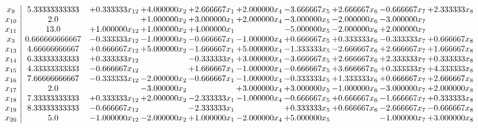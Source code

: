 \documentclass[10pt]{article}
\begin{document}
 \[\begin{array}{c| c c@{\hskip 2pt} c@{\hskip 2pt} c@{\hskip 2pt} c@{\hskip 2pt} c@{\hskip 2pt} c@{\hskip 2pt} c@{\hskip 2pt} c@{\hskip 2pt} }
 x_{9}   &  5.33333333333 & + 0.333333 x_{12} & + 4.000000 x_{2} & + 2.666667 x_{1} & + 2.000000 x_{4} & -3.666667 x_{5} & + 2.666667 x_{6} & -0.666667 x_{7} & + 2.333333 x_{8}\\
 x_{10}   &  2.0  &   & + 1.000000 x_{2} & + 3.000000 x_{1} & + 2.000000 x_{4} & -3.000000 x_{5} & -2.000000 x_{6} & -3.000000 x_{7} &   \\
 x_{11}   &  13.0 & + 1.000000 x_{12} & + 1.000000 x_{2} & + 4.000000 x_{1} &   & -5.000000 x_{5} & -2.000000 x_{6} & + 2.000000 x_{7} &   \\
 x_{3}   &  0.666666666667 & -0.333333 x_{12} & -1.000000 x_{2} & -0.666667 x_{1} & -1.000000 x_{4} & + 0.666667 x_{5} & + 0.333333 x_{6} & -0.333333 x_{7} & + 0.666667 x_{8}\\
 x_{13}   &  4.66666666667 & + 0.666667 x_{12} & + 5.000000 x_{2} & -1.666667 x_{1} & + 5.000000 x_{4} & -1.333333 x_{5} & -2.666667 x_{6} & + 2.666667 x_{7} & + 1.666667 x_{8}\\
 x_{14}   &  6.33333333333 & + 0.333333 x_{12} &   & -0.333333 x_{1} & + 3.000000 x_{4} & -3.666667 x_{5} & + 2.666667 x_{6} & + 2.333333 x_{7} & + 0.333333 x_{8}\\
 x_{15}   &  4.33333333333 & -0.666667 x_{12} &   & + 1.666667 x_{1} & -1.000000 x_{4} & -0.666667 x_{5} & + 3.666667 x_{6} & + 0.333333 x_{7} & + 4.333333 x_{8}\\
 x_{16}   &  7.66666666667 & -0.333333 x_{12} & -2.000000 x_{2} & -0.666667 x_{1} & -1.000000 x_{4} & -0.333333 x_{5} & + 1.333333 x_{6} & + 0.666667 x_{7} & + 2.666667 x_{8}\\
 x_{17}   &  2.0  &   & -3.000000 x_{2} &   & + 3.000000 x_{4} & + 3.000000 x_{5} & -1.000000 x_{6} & -3.000000 x_{7} & + 2.000000 x_{8}\\
 x_{18}   &  7.33333333333 & + 0.333333 x_{12} & + 2.000000 x_{2} & -2.333333 x_{1} & -1.000000 x_{4} & -0.666667 x_{5} & + 0.666667 x_{6} & -1.666667 x_{7} & + 0.333333 x_{8}\\
 x_{19}   &  8.33333333333 & -0.666667 x_{12} &   & -2.333333 x_{1} &   & + 0.333333 x_{5} & + 0.666667 x_{6} & -2.666667 x_{7} & -0.666667 x_{8}\\
 x_{20}   &  5.0 & -1.000000 x_{12} & -2.000000 x_{2} & + 1.000000 x_{1} & -2.000000 x_{4} & + 5.000000 x_{5} &   & -1.000000 x_{7} & + 3.000000 x_{8}\\

\end{array}\]
\end{document}
